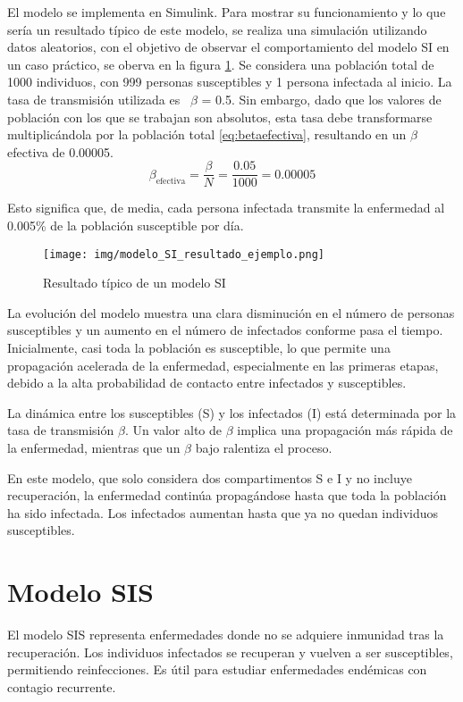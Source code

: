 El modelo se implementa en Simulink. Para mostrar su funcionamiento y lo que sería un resultado típico de este modelo, se realiza una simulación utilizando datos aleatorios, con el objetivo de observar el comportamiento del modelo SI en un caso práctico, se oberva en la figura \ref{fig:ejemplo SI}. Se considera una población total de 1000 individuos, con 999 personas susceptibles y 1 persona infectada al inicio. La tasa de transmisión utilizada es ~$\beta$ = 0.5. Sin embargo, dado que los valores de población con los que se trabajan son absolutos, esta tasa debe transformarse multiplicándola por la población total \ref{eq:betaefectiva}, resultando en un $\beta$ efectiva de 0.00005.
\begin{equation}
\beta_{\text{efectiva}} = \frac{\beta}{N} = \frac{0.05}{1000} = 0.00005
\label{eq:betaefectiva}
\end{equation}

Esto significa que, de media, cada persona infectada transmite la enfermedad al 0.005\% de la población susceptible por día.

\begin{figure}[H]
    \centering
    \texttt{[image: img/modelo\_SI\_resultado\_ejemplo.png]}
    \caption{Resultado típico de un modelo SI}
    \label{fig:ejemplo SI}
    \vspace{0.5cm} %
\end{figure}

La evolución del modelo muestra una clara disminución en el número de personas susceptibles y un aumento en el número de infectados conforme pasa el tiempo. Inicialmente, casi toda la población es susceptible, lo que permite una propagación acelerada de la enfermedad, especialmente en las primeras etapas, debido a la alta probabilidad de contacto entre infectados y susceptibles.

La dinámica entre los susceptibles (S) y los infectados (I) está determinada por la tasa de transmisión $\beta$. Un valor alto de $\beta$ implica una propagación más rápida de la enfermedad, mientras que un $\beta$ bajo ralentiza el proceso.

En este modelo, que solo considera dos compartimentos S e I y no incluye recuperación, la enfermedad continúa propagándose hasta que toda la población ha sido infectada. Los infectados aumentan hasta que ya no quedan individuos susceptibles.


\section{Modelo SIS}
El modelo SIS representa enfermedades donde no se adquiere inmunidad tras la recuperación. Los individuos infectados se recuperan y vuelven a ser susceptibles, permitiendo reinfecciones. Es útil para estudiar enfermedades endémicas con contagio recurrente.

